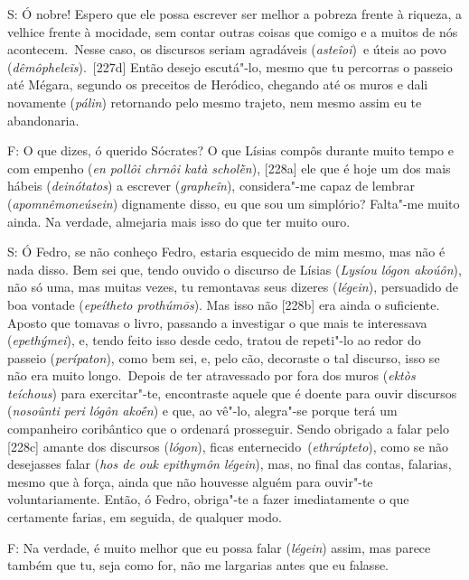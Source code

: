 S: Ó nobre! Espero que ele possa escrever ser melhor a pobreza frente à
riqueza, a velhice frente à mocidade, sem contar outras coisas que
comigo e a muitos de nós acontecem.~Nesse caso, os discursos seriam
agradáveis (\emph{asteîoi})~e úteis ao povo
(\emph{dêmôpheleĩs}).~[227d] Então desejo escutá"-lo, mesmo que tu
percorras o passeio até Mégara, segundo os preceitos de Heródico,
chegando até os muros e dali novamente (\emph{pálin}) retornando pelo
mesmo trajeto, nem mesmo assim eu te abandonaria.

 

F: O que dizes, ó querido Sócrates? O que Lísias compôs durante muito
tempo e com empenho (\emph{en pollôi chrnôi katà scholḕn}), [228a]
ele que é hoje um dos mais hábeis (\emph{deinótatos}) a escrever
(\emph{grapheîn}), considera"-me capaz de lembrar
(\emph{apomnêmoneúsein}) dignamente disso, eu que sou um simplório?
Falta"-me muito ainda. Na verdade, almejaria mais isso do que ter muito
ouro.

 

S: Ó Fedro, se não conheço Fedro, estaria esquecido de mim mesmo, mas
não é nada disso. Bem sei que, tendo ouvido o discurso de Lísias
(\emph{Lysíou lógon akoúôn}), não só uma, mas muitas vezes, tu
remontavas seus dizeres (\emph{légein}), persuadido de boa vontade
(\emph{epeítheto prothúmōs}). Mas isso não [228b] era ainda o
suficiente. Aposto que tomavas o livro, passando a investigar o que mais
te interessava (\emph{epethýmei}), e, tendo feito isso desde cedo,
tratou de repeti"-lo ao redor do passeio (\emph{perípaton}), como bem
sei, e, pelo cão, decoraste o tal discurso, isso se não era muito
longo.~Depois de ter atravessado por fora dos muros (\emph{ektòs
teíchous}) para exercitar"-te, encontraste aquele que é doente para ouvir
discursos (\emph{nosoûnti peri lógôn akoḗn}) e que, ao vê"-lo, alegra"-se
porque terá um companheiro coribântico que o ordenará prosseguir. Sendo
obrigado a falar pelo [228c] amante dos discursos (\emph{lógon}),
ficas enternecido~(\emph{ethrúpteto}), como se não desejasses falar
(\emph{hos de ouk epithymôn légein}), mas, no final das contas,
falarias, mesmo que à força, ainda que não houvesse alguém para ouvir"-te
voluntariamente. Então, ó Fedro, obriga"-te a fazer imediatamente o que
certamente farias, em seguida, de qualquer modo.

 

F: Na verdade, é muito melhor que eu possa falar (\emph{légein}) assim,
mas parece também que tu, seja como for, não me largarias antes que eu
falasse.

